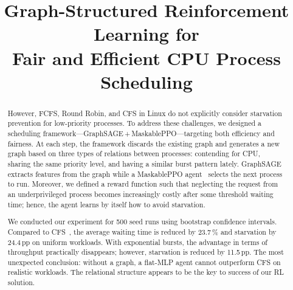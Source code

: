 \documentclass[conference]{IEEEtran}
\newcommand{\pp}{\,pp}
\begin{document}
\title{Graph-Structured Reinforcement Learning for\\
Fair and Efficient CPU Process Scheduling}

\author{
\and
{}
\and
{}
}

\maketitle

\begin{abstract}
However, FCFS, Round Robin, and CFS in Linux do not explicitly consider
starvation prevention for low-priority processes. To address these
challenges, we designed a scheduling
framework---GraphSAGE\,+\,MaskablePPO---targeting both efficiency and
fairness. At each step, the framework discards the existing graph and
generates a new graph based on three types of relations between processes:
contending for CPU, sharing the same priority level, and having a similar
burst pattern lately. GraphSAGE~\cite{hamilton2017graphsage} extracts
features from the graph while a MaskablePPO
agent~\cite{raffin2021sb3} selects the next process to run. Moreover, we
defined a reward function such that neglecting the request from an
underprivileged process becomes increasingly costly after some threshold
waiting time; hence, the agent learns by itself how to avoid starvation.

We conducted our experiment for 500 seed runs using bootstrap confidence
intervals. Compared to CFS~\cite{molnar2007cfs}, the average waiting time
is reduced by 23.7\,\% and starvation by 24.4\pp{} on uniform workloads.
With exponential bursts, the advantage in terms of throughput practically
disappears; however, starvation is reduced by 11.5\pp. The most unexpected
conclusion: without a graph, a flat-MLP agent cannot outperform CFS on
realistic workloads. The relational structure appears to be the key to
success of our RL solution.
\end{abstract}
\end{document}
